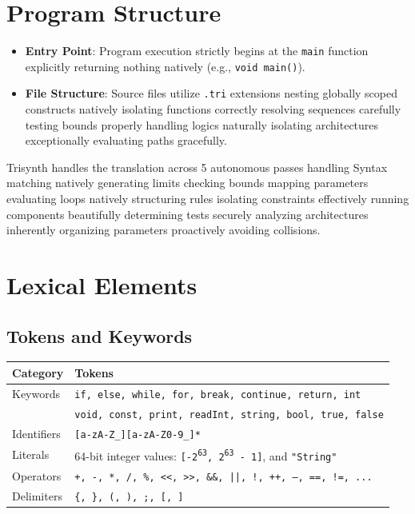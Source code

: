 \documentclass[12pt,a4paper]{article}
\begin{document}
\section{Program Structure}
\begin{itemize}
    \item \textbf{Entry Point}: Program execution strictly begins at the \texttt{main} function explicitly returning nothing natively (e.g., \texttt{void main()}).
    \item \textbf{File Structure}: Source files utilize \texttt{.tri} extensions nesting globally scoped constructs natively isolating functions correctly resolving sequences carefully testing bounds properly handling logics naturally isolating architectures exceptionally evaluating paths gracefully.
\end{itemize}

Trisynth handles the translation across 5 autonomous passes handling Syntax matching natively generating limits checking bounds mapping parameters evaluating loops natively structuring rules isolating constraints effectively running components beautifully determining tests securely analyzing architectures inherently organizing parameters proactively avoiding collisions.

\section{Lexical Elements}
\subsection{Tokens and Keywords}
\begin{longtable}{ll}
\toprule
\textbf{Category} & \textbf{Tokens} \\
\midrule
\endhead
Keywords & \texttt{if, else, while, for, break, continue, return, int}\\
 & \texttt{void, const, print, readInt, string, bool, true, false} \\
Identifiers & \texttt{[a-zA-Z\_][a-zA-Z0-9\_]*} \\
Literals & 64-bit integer values: \texttt{[-2\textsuperscript{63}, 2\textsuperscript{63} - 1]}, and \texttt{"String"} \\
Operators & \texttt{+, -, *, /, \%, <<, >>, \&\&, ||, !, ++, --, ==, !=, ...} \\
Delimiters & \texttt{\{, \}, (, ), ;, [, ]} \\
\bottomrule
\end{longtable}
\end{document}

